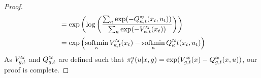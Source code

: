 \begin{appendices}
\begin{proof}
\begin{align*}
  &= \exp \left( \log \left( \frac{\sum_\kappa \exp( -Q^{\approx}_{ \kappa,{t}}(x_t, u_t))} {\sum_{\kappa} \exp(-V^{\approx}_{ \kappa,{t}}(x_{t}) )} \right) \right)\\
  &= \exp \left( \operatorname*{\text{soft}\!\min}_\kappa V^{\approx}_{ \kappa,{t}}(x_t) - \operatorname*{\text{soft}\!\min}_\kappa Q^{\approx}_{\kappa}{t}(x_t, u_t) \right)
\end{align*}
As $V^{\approx}_{ g,{t}}$ and $Q^{\approx}_{ g,{t}}$ are defined such that $\pi^{\text{u}}_t(u | x, g) = \exp(V^{\approx}_{ g,{t}}(x) -Q^{\approx}_{ g,{t}}(x, u))$, our proof is complete.
\end{proof}


\newcommand{\inreg}[1]{n_{#1}}
\newcommand{\inreghat}[1]{\widehat{n}_{#1}}
\newcommand{\numwithobs}[1]{n^{#1}}
\newcommand{\numwithobshat}[1]{\widehat{n}^{#1}}
\newcommand{\inregandobs}[2]{n_{#1}^{#2}}
\newcommand{\inregandobshat}[2]{\widehat{n}_{#1}^{#2}}
\newcommand{\totalhypoths}{N}
\newcommand{\totalhypothshat}{\widehat{N}}

\newcommand{\edgermind}{l}
\newcommand{\inregrm}{\inreg{\edgermind}}
\newcommand{\subregrm}{\subreg{\edgermind}}


\newcommand{\hyperedgesetk}{\hyperedgeset_\edgermind}
\newcommand{\hyperedgesetnok}{\overline{\hyperedgeset_{\edgermind}}}

\newcommand{\minhyperedgeset}{\hyperedgeset^{\min}}
\newcommand{\minhyperedgesetk}{\minhyperedgeset_\edgermind}
\newcommand{\minhyperedgesetnok}{\overline{\minhyperedgeset_{\edgermind}}}
\newcommand{\nominhyperedgeset}{\hyperedgeset^{\overline{\min}}}
\newcommand{\nominhyperedgesetk}{\nominhyperedgeset_\edgermind}
\newcommand{\nominhyperedgesetnok}{\overline{\nominhyperedgeset_{\edgermind}}}
\newcommand{\numk}{ {\vert\hyperedge_\edgermind\vert} }

\newcommand*\circled[1]{\tikz[baseline=(char.base)]{\node[shape=circle,draw,inner sep=2pt] (char) {#1};}}

\newcommand{\sumhe}{\sum_{\hyperedge \in \hyperedgeset}}
\newcommand{\sumhek}{\sum_{\hyperedge \in \hyperedgesetk}}
\newcommand{\sumhenok}{\sum_{\hyperedge \in \hyperedgesetnok}}
\newcommand{\summinhenok}{\sum_{\hyperedge \in \minhyperedgesetnok}}
\newcommand{\sumnominhenok}{\sum_{\hyperedge \in \nominhyperedgesetnok}}
\newcommand{\sumallobs}{\sum_{\observationitem \in \observationset}} 
\newcommand{\sumobsnotc}{\sum_{\observationitem \in \observationset \backslash c}} 

\newcommand{\prodedge}{\prod_{i \in \hyperedge}}
\newcommand{\prodedgenok}{\prod_{i \in \hyperedge, i \neq l}}




\end{appendices}
